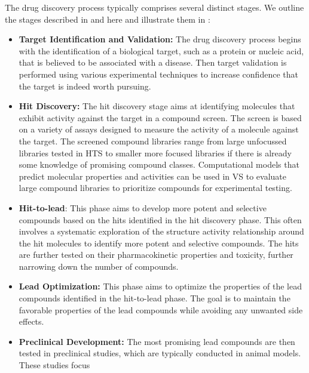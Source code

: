 The drug discovery process typically comprises several distinct stages. We outline the stages
described in \citet{hughesPrinciplesEarlyDrug2011} and \citep{umscheidKeyConceptsClinical2011} here and illustrate them in :
\begin{itemize}
      \item \textbf{Target Identification and Validation:} The drug discovery process begins with
            the identification of a biological target, such as a protein or nucleic acid, that is
            believed to be associated with a disease. Then target validation is performed using
            various experimental techniques to increase confidence that the target is indeed worth
            pursuing.
      \item \textbf{Hit Discovery:} The hit discovery stage aims at identifying molecules that
            exhibit activity against the target in a compound screen. The screen is based on a
            variety of assays designed to measure the activity of a molecule against the target. The
            screened compound libraries range from large unfocussed libraries tested in \ac{HTS} to
            smaller more focused libraries if there is already some knowledge of promising compound
            classes. Computational models that predict molecular properties and activities can be
            used in \ac{VS} to evaluate large compound libraries to prioritize compounds for
            experimental testing.
      \item \textbf{Hit-to-lead}: This phase aims to develop more potent and selective compounds
            based on the hits identified in the hit discovery phase. This often involves a
            systematic exploration of the structure activity relationship around the hit molecules
            to identify more potent and selective compounds. The hits are further tested on their
            pharmacokinetic properties and toxicity, further narrowing down the number of compounds.
      \item \textbf{Lead Optimization:} This phase aims to optimize the properties of the
            lead compounds identified in the hit-to-lead phase. The goal is to maintain the favorable
            properties of the lead compounds while avoiding any unwanted side effects.
      \item \textbf{Preclinical Development:} The most promising lead compounds are then tested in
            preclinical studies, which are typically conducted in animal models. These studies focus

\end{itemize}
